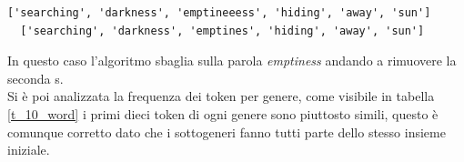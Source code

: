 \documentclass[technote]{IEEEtran}
\begin{document}
\begin{lstlisting}[basicstyle=\tiny]
  ['searching', 'darkness', 'emptineeess', 'hiding', 'away', 'sun']
  ['searching', 'darkness', 'emptines', 'hiding', 'away', 'sun']
\end{lstlisting}
In questo caso l'algoritmo sbaglia sulla parola \textit{emptiness} andando a rimuovere la seconda s. \\
Si è poi analizzata la frequenza dei token per genere, come visibile in tabella \ref{t_10_word} i primi dieci token di ogni genere sono piuttosto simili, questo è comunque corretto dato che i sottogeneri fanno tutti parte dello stesso insieme iniziale.
\begin{table}[H]
\centering
\caption{Top 10 parole frequenti per genere}
\end{table}
\end{document}

